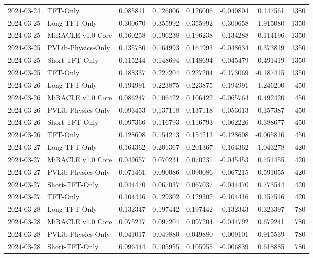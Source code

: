\begin{tabular}{llrrrrrr}
2024-03-24 & TFT-Only & 0.085811 & 0.126006 & 0.126006 & -0.040804 & 0.147561 & 1380 \\
2024-03-25 & Long-TFT-Only & 0.300670 & 0.355992 & 0.355992 & -0.300658 & -1.915080 & 1350 \\
2024-03-25 & MiRACLE v1.0 Core & 0.160258 & 0.196238 & 0.196238 & -0.134288 & 0.114196 & 1350 \\
2024-03-25 & PVLib-Physics-Only & 0.135780 & 0.164993 & 0.164993 & -0.048634 & 0.373819 & 1350 \\
2024-03-25 & Short-TFT-Only & 0.115244 & 0.148694 & 0.148694 & -0.045479 & 0.491419 & 1350 \\
2024-03-25 & TFT-Only & 0.188337 & 0.227204 & 0.227204 & -0.173069 & -0.187415 & 1350 \\
2024-03-26 & Long-TFT-Only & 0.194991 & 0.223875 & 0.223875 & -0.194991 & -1.246200 & 450 \\
2024-03-26 & MiRACLE v1.0 Core & 0.086247 & 0.106422 & 0.106422 & -0.065764 & 0.492420 & 450 \\
2024-03-26 & PVLib-Physics-Only & 0.093453 & 0.137118 & 0.137118 & 0.053613 & 0.157387 & 450 \\
2024-03-26 & Short-TFT-Only & 0.097366 & 0.116793 & 0.116793 & -0.062226 & 0.388677 & 450 \\
2024-03-26 & TFT-Only & 0.128608 & 0.154213 & 0.154213 & -0.128608 & -0.065816 & 450 \\
2024-03-27 & Long-TFT-Only & 0.164362 & 0.201367 & 0.201367 & -0.164362 & -1.043278 & 420 \\
2024-03-27 & MiRACLE v1.0 Core & 0.049657 & 0.070231 & 0.070231 & -0.045453 & 0.751455 & 420 \\
2024-03-27 & PVLib-Physics-Only & 0.071461 & 0.090086 & 0.090086 & 0.067215 & 0.591055 & 420 \\
2024-03-27 & Short-TFT-Only & 0.044470 & 0.067037 & 0.067037 & -0.044470 & 0.773544 & 420 \\
2024-03-27 & TFT-Only & 0.104416 & 0.129302 & 0.129302 & -0.104416 & 0.157516 & 420 \\
2024-03-28 & Long-TFT-Only & 0.132347 & 0.197442 & 0.197442 & -0.132343 & -0.323397 & 780 \\
2024-03-28 & MiRACLE v1.0 Core & 0.075217 & 0.097204 & 0.097204 & -0.044792 & 0.679241 & 780 \\
2024-03-28 & PVLib-Physics-Only & 0.041017 & 0.049880 & 0.049880 & 0.009101 & 0.915539 & 780 \\
2024-03-28 & Short-TFT-Only & 0.096444 & 0.105955 & 0.105955 & -0.006839 & 0.618885 & 780 \\

\end{tabular}
